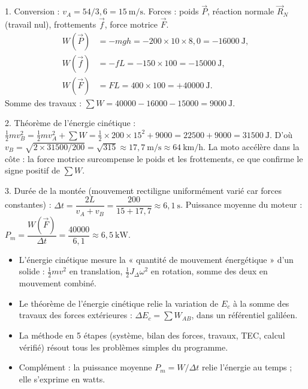 \documentclass[11pt]{article}
\begin{document}
\begin{corrige}
1. Conversion : $v_A = 54/3{,}6 = 15~\text{m/s}$. Forces : poids $\vec{P}$, réaction normale $\vec{R}_N$ (travail nul), frottements $\vec{f}$, force motrice $\vec{F}$.
\begin{align*}
W(\vec{P}) &= -mgh = -200\times 10 \times 8{,}0 = -\num{16000}~\text{J},\\
W(\vec{f}) &= -fL = -150 \times 100 = -\num{15000}~\text{J},\\
W(\vec{F}) &= FL = 400 \times 100 = +\num{40000}~\text{J}.
\end{align*}
Somme des travaux : $\sum W = \num{40000} - \num{16000} - \num{15000} = \num{9000}~\text{J}$.

2. Théorème de l'énergie cinétique : $\tfrac{1}{2}mv_B^2 = \tfrac{1}{2}mv_A^2 + \sum W = \tfrac{1}{2}\times 200 \times 15^2 + 9000 = \num{22500} + 9000 = \num{31500}~\text{J}$. D'où $v_B = \sqrt{2\times 31500/200} = \sqrt{315} \approx 17{,}7~\text{m/s} \approx 64~\text{km/h}$. La moto accélère dans la côte : la force motrice surcompense le poids et les frottements, ce que confirme le signe positif de $\sum W$.

3. Durée de la montée (mouvement rectiligne uniformément varié car forces constantes) : $\Delta t = \dfrac{2L}{v_A + v_B} = \dfrac{200}{15 + 17{,}7} \approx 6{,}1~\text{s}$. Puissance moyenne du moteur : $P_m = \dfrac{W(\vec{F})}{\Delta t} = \dfrac{\num{40000}}{6{,}1} \approx 6{,}5~\text{kW}$.
\end{corrige}

\begin{aretenir}
\begin{itemize}
\item L'énergie cinétique mesure la « quantité de mouvement énergétique » d'un solide : $\tfrac{1}{2}mv^2$ en translation, $\tfrac{1}{2}J_{\Delta}\omega^2$ en rotation, somme des deux en mouvement combiné.
\item Le théorème de l'énergie cinétique relie la variation de $E_c$ à la somme des travaux des forces extérieures : $\Delta E_c = \sum W_{AB}$, dans un référentiel galiléen.
\item La méthode en 5 étapes (système, bilan des forces, travaux, TEC, calcul vérifié) résout tous les problèmes simples du programme.
\item Complément : la puissance moyenne $P_m = W/\Delta t$ relie l'énergie au temps ; elle s'exprime en watts.
\end{itemize}
\end{aretenir}
\end{document}
